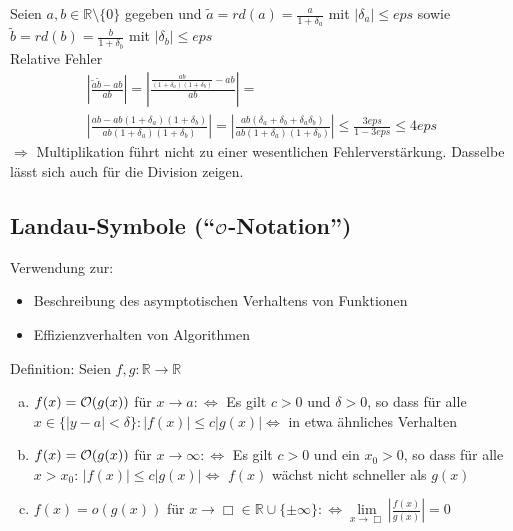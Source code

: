 Seien $ a, b \in \mathbb{R}\setminus\{0\} $ gegeben und
$ \tilde{a} = rd(a) = \frac{a}{1 + \delta_{a}} $ mit $ | \delta_{a} | \leq eps $ sowie
$ \tilde{b} = rd(b) = \frac{b}{1 + \delta_{b}} $ mit $ | \delta_{b} | \leq eps $ \\
Relative Fehler
\begin{gather*}
\left| \frac{\tilde{a}\tilde{b} - a b}{a b} \right| =
\left| \frac{\frac{ab}{(1 + \delta_{a})(1 + \delta_{b})} - ab}{ab}\right| = \\
\left| \frac{ab - ab(1 + \delta_{a})(1 + \delta_{b})}{ab(1 + \delta_{a})(1 + \delta_{b})} \right| =
\left| \frac{ab(\delta_{a} + \delta_{b} + \delta_{a}\delta_{b})}{ab(1 + \delta_{a})(1 + \delta_{b})} \right| \leq
\frac{3eps}{1 - 3eps} \leq 4eps 
\end{gather*}
$\Rightarrow$ Multiplikation führt nicht zu einer wesentlichen Fehlerverstärkung.
Dasselbe lässt sich auch für die Division zeigen.

\subsection{Landau-Symbole (``$\mathcal{O}$-Notation'')}
Verwendung zur:
\begin{itemize}
  \item Beschreibung des asymptotischen Verhaltens von Funktionen
  \item Effizienzverhalten von Algorithmen
\end{itemize}
Definition: Seien $f,g: \mathbb{R} \to \mathbb{R}$
\begin{enumerate}[(a)]
  \item $f(x) = \mathcal{O}(g(x))$ für $x \to a :\Leftrightarrow$
    Es gilt $c > 0$ und $\delta > 0$, so dass für alle $x \in \{|y - a| < \delta\}: |f(x)| \leq c|g(x)| \Leftrightarrow$ in etwa ähnliches Verhalten
  \item $f(x) = \mathcal{O}(g(x))$ für $x \to \infty :\Leftrightarrow$
    Es gilt $c > 0$ und ein $x_0 > 0$, so dass für alle $x > x_0:\,|f(x)| \leq c|g(x)| \Leftrightarrow$ $f(x)$ wächst nicht schneller als $g(x)$
  \item $f(x) = o(g(x))$ für $x \to \Box \in \mathbb{R} \cup \{\pm \infty\} :\Leftrightarrow
    \underset{x \to \Box}{\lim}|\frac{f(x)}{g(x)}| = 0$
\end{enumerate}

